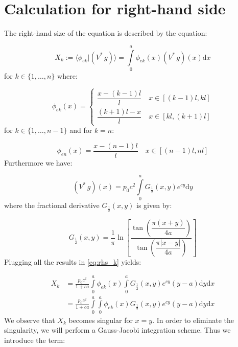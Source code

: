 \documentclass[12pt,letterpaper]{article}
\theoremstyle{definition}
\numberwithin{equation}{subsection}
\newcommand{\dd}{\text{d}}
\begin{document}
\section*{Calculation for right-hand side}

The right-hand size of the equation is described by the equation:

\begin{equation} \label{eq:rhs_k}
    X_{k} := \langle \phi_{ek} | (V^* \, g) \rangle = \int\limits_0^a \phi_{ek}(x)(V^* \, g) (x) \dd x 
\end{equation}
for $k \in \{1, \dots, n\}$ where:

\begin{equation}
    \phi_{ek}(x) =
    \begin{cases}
        \dfrac{x - (k-1)l}{l} \quad x \in [(k-1)l, kl] \\[10pt]
        \dfrac{(k+1)l - x}{l} \quad x \in [kl, (k+1)l]
    \end{cases}
\end{equation}
for $k \in \{1, \dots, n-1\}$ and for $k=n$:

\begin{equation}
    \phi_{en}(x) =
    \dfrac{x - (n-1)l}{l} \quad x \in [(n-1)l, nl]
\end{equation}
Furthermore we have:

\begin{equation}
    (V^* \, g)(x) = p_0 c^2 \int\limits_0^a G_{\frac{1}{2}}(x,y)e^{cy}\dd y
\end{equation}
where the fractional derivative $G_{\frac{1}{2}}(x,y)$ is given by:

\begin{equation}
    G_{\frac{1}{2}}(x,y) = \dfrac{1}{\pi} \ln \left[\dfrac{\tan\left(\dfrac{\pi (x+y)}{4a}\right)}{\tan\left(\dfrac{\pi |x-y|}{4a}\right)}\right]
\end{equation}
Plugging all the results in \ref{eq:rhs_k} yields:

\begin{align}
    X_{k} &= \frac{p_0 c^2}{1+ca} \int\limits_0^a \phi_{ek}(x)\int\limits_0^a G_{\frac{1}{2}}(x,y) e^{cy}(y-a)\dd y\dd x \\
    &= \frac{p_0 c^2}{1+ca} \int\limits_0^a \int\limits_0^a \phi_{ek}(x)G_{\frac{1}{2}}(x,y) e^{cy}(y-a)\dd y\dd x
\end{align}
We observe that $X_k$ becomes singular for $x=y$. In order to eliminate the singularity, we will perform a Gauss-Jacobi integration scheme. Thus we introduce the term:
\end{document}
